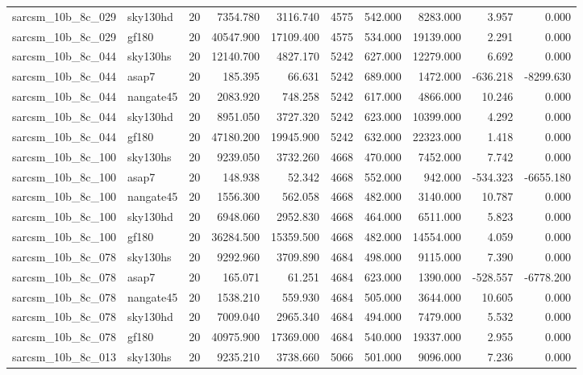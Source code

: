 \begin{longtable}{llrrrrrrrr}
sarcsm\_10b\_8c\_029 & sky130hd & 20 & 7354.780 & 3116.740 & 4575 & 542.000 & 8283.000 & 3.957 & 0.000 \\
sarcsm\_10b\_8c\_029 & gf180 & 20 & 40547.900 & 17109.400 & 4575 & 534.000 & 19139.000 & 2.291 & 0.000 \\
sarcsm\_10b\_8c\_044 & sky130hs & 20 & 12140.700 & 4827.170 & 5242 & 627.000 & 12279.000 & 6.692 & 0.000 \\
sarcsm\_10b\_8c\_044 & asap7 & 20 & 185.395 & 66.631 & 5242 & 689.000 & 1472.000 & -636.218 & -8299.630 \\
sarcsm\_10b\_8c\_044 & nangate45 & 20 & 2083.920 & 748.258 & 5242 & 617.000 & 4866.000 & 10.246 & 0.000 \\
sarcsm\_10b\_8c\_044 & sky130hd & 20 & 8951.050 & 3727.320 & 5242 & 623.000 & 10399.000 & 4.292 & 0.000 \\
sarcsm\_10b\_8c\_044 & gf180 & 20 & 47180.200 & 19945.900 & 5242 & 632.000 & 22323.000 & 1.418 & 0.000 \\
sarcsm\_10b\_8c\_100 & sky130hs & 20 & 9239.050 & 3732.260 & 4668 & 470.000 & 7452.000 & 7.742 & 0.000 \\
sarcsm\_10b\_8c\_100 & asap7 & 20 & 148.938 & 52.342 & 4668 & 552.000 & 942.000 & -534.323 & -6655.180 \\
sarcsm\_10b\_8c\_100 & nangate45 & 20 & 1556.300 & 562.058 & 4668 & 482.000 & 3140.000 & 10.787 & 0.000 \\
sarcsm\_10b\_8c\_100 & sky130hd & 20 & 6948.060 & 2952.830 & 4668 & 464.000 & 6511.000 & 5.823 & 0.000 \\
sarcsm\_10b\_8c\_100 & gf180 & 20 & 36284.500 & 15359.500 & 4668 & 482.000 & 14554.000 & 4.059 & 0.000 \\
sarcsm\_10b\_8c\_078 & sky130hs & 20 & 9292.960 & 3709.890 & 4684 & 498.000 & 9115.000 & 7.390 & 0.000 \\
sarcsm\_10b\_8c\_078 & asap7 & 20 & 165.071 & 61.251 & 4684 & 623.000 & 1390.000 & -528.557 & -6778.200 \\
sarcsm\_10b\_8c\_078 & nangate45 & 20 & 1538.210 & 559.930 & 4684 & 505.000 & 3644.000 & 10.605 & 0.000 \\
sarcsm\_10b\_8c\_078 & sky130hd & 20 & 7009.040 & 2965.340 & 4684 & 494.000 & 7479.000 & 5.532 & 0.000 \\
sarcsm\_10b\_8c\_078 & gf180 & 20 & 40975.900 & 17369.000 & 4684 & 540.000 & 19337.000 & 2.955 & 0.000 \\
sarcsm\_10b\_8c\_013 & sky130hs & 20 & 9235.210 & 3738.660 & 5066 & 501.000 & 9096.000 & 7.236 & 0.000 \\

\end{longtable}
